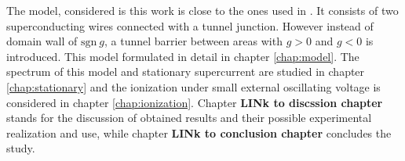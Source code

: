 The model, considered is this work is close to the ones used in \cite{Oreg_2010}\cite{Lutchyn_2010}. It consists of two superconducting wires connected with a tunnel junction. However instead of domain wall of $ \mathrm{sgn}~g $, a tunnel barrier between areas with $ g>0 $ and $ g<0 $ is introduced. This model formulated in detail in chapter \ref{chap:model}. The spectrum of this model and stationary supercurrent are studied in chapter \ref{chap:stationary} and the ionization under small external oscillating voltage is considered in chapter \ref{chap:ionization}. Chapter \textbf{LINk to discssion chapter}  stands for the discussion of obtained results and their possible experimental realization and use, while chapter \textbf{LINk to conclusion chapter} concludes the study.



